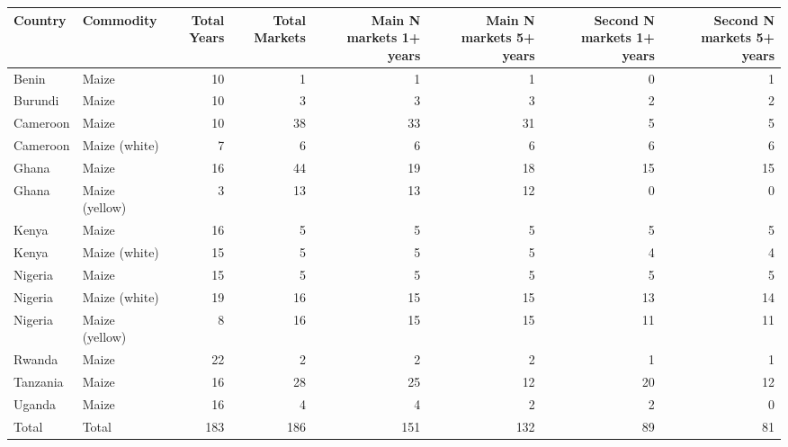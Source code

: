 \begin{table}[ht]
\centering
\begin{tabular}{llrrrrrr}
  \hline
Country & Commodity & Total Years & Total Markets & Main N markets 1+ years & Main N markets 5+ years & Second N markets 1+ years & Second N markets 5+ years \\ 
  \hline
Benin & Maize &  10 &   1 &   1 &   1 &   0 &   1 \\ 
  Burundi & Maize &  10 &   3 &   3 &   3 &   2 &   2 \\ 
  Cameroon & Maize &  10 &  38 &  33 &  31 &   5 &   5 \\ 
  Cameroon & Maize (white) &   7 &   6 &   6 &   6 &   6 &   6 \\ 
  Ghana & Maize &  16 &  44 &  19 &  18 &  15 &  15 \\ 
  Ghana & Maize (yellow) &   3 &  13 &  13 &  12 &   0 &   0 \\ 
  Kenya & Maize &  16 &   5 &   5 &   5 &   5 &   5 \\ 
  Kenya & Maize (white) &  15 &   5 &   5 &   5 &   4 &   4 \\ 
  Nigeria & Maize &  15 &   5 &   5 &   5 &   5 &   5 \\ 
  Nigeria & Maize (white) &  19 &  16 &  15 &  15 &  13 &  14 \\ 
  Nigeria & Maize (yellow) &   8 &  16 &  15 &  15 &  11 &  11 \\ 
  Rwanda & Maize &  22 &   2 &   2 &   2 &   1 &   1 \\ 
  Tanzania & Maize &  16 &  28 &  25 &  12 &  20 &  12 \\ 
  Uganda & Maize &  16 &   4 &   4 &   2 &   2 &   0 \\ 
  Total & Total & 183 & 186 & 151 & 132 &  89 &  81 \\ 
   \hline
\end{tabular}
\end{table}

